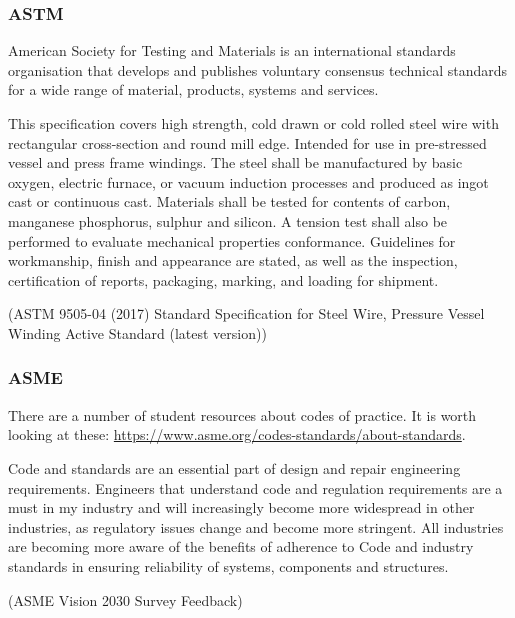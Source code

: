 \subsubsection{ASTM}
American Society for Testing and Materials is an international standards organisation that develops and publishes voluntary consensus technical standards for a wide range of material, products, systems and services.
\begin{quoting}
    This specification covers high strength, cold drawn or cold rolled steel wire with rectangular cross-section and round mill edge. Intended for use in pre-stressed vessel and press frame windings. The steel shall be manufactured by basic oxygen, electric furnace, or vacuum induction processes and produced as ingot cast or continuous cast. Materials shall be tested for contents of carbon, manganese phosphorus, sulphur and silicon. A tension test shall also be performed to evaluate mechanical properties conformance. Guidelines for workmanship, finish and appearance are stated, as well as the inspection, certification of reports, packaging, marking, and loading for shipment.

    (ASTM 9505-04 (2017) Standard Specification for Steel Wire, Pressure Vessel Winding Active Standard (latest version))
\end{quoting}
\subsubsection{ASME}
There are a number of student resources about codes of practice. It is worth looking at these: \url{https://www.asme.org/codes-standards/about-standards}.
\begin{quoting}
    Code and standards are an essential part of design and repair engineering requirements. Engineers that understand code and regulation requirements are a must in my industry and will increasingly become more widespread in other industries, as regulatory issues change and become more stringent. All industries are becoming more aware of the benefits of adherence to Code and industry standards in ensuring reliability of systems, components and structures.

    (ASME Vision 2030 Survey Feedback)
\end{quoting}
